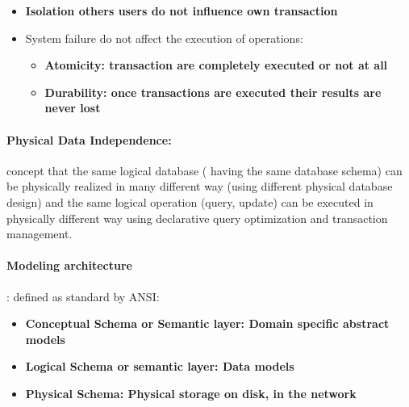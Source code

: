 \begin{itemize}
	\item \bf{Isolation} others users do not influence own transaction
	\item System failure do not affect the execution of operations:
	\begin{itemize}
		\item \bf{Atomicity:} transaction are completely executed or not at all
		\item \bf{Durability:} once transactions are executed their results are never lost
	\end{itemize}
\end{itemize}

\paragraph{Physical Data Independence:}  concept that the same logical database ( having the same database schema) can be physically realized in many different way (using different physical database design) and the same logical operation (query, update) can be executed in physically different way using declarative query optimization and transaction management. 


\paragraph{Modeling architecture}: defined as standard by ANSI:
\begin{itemize}
	\item \bf{Conceptual Schema or Semantic layer:} Domain specific abstract models
	\item \bf{Logical Schema or semantic layer:} Data models
  	\item \bf{Physical Schema:} Physical storage on disk, in the network
\end{itemize}


